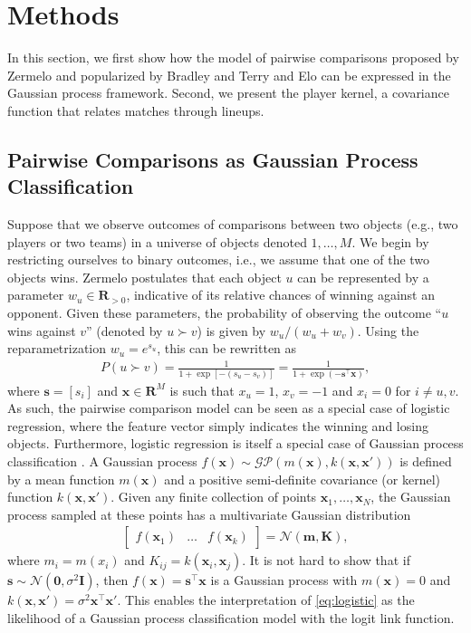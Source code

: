 \section{Methods}
\label{sec:methods}

In this section, we first show how the model of pairwise comparisons proposed by Zermelo \cite{zermelo1928berechnung} and popularized by Bradley and Terry \cite{bradley1952rank} and Elo \cite{elo1978rating} can be expressed in the Gaussian process framework.
Second, we present the player kernel, a covariance function that relates matches through lineups.


\subsection{Pairwise Comparisons as Gaussian Process Classification}

Suppose that we observe outcomes of comparisons between two objects (e.g., two players or two teams) in a universe of objects denoted $1, \ldots, M$.
We begin by restricting ourselves to binary outcomes, i.e., we assume that one of the two objects wins.
Zermelo \cite{zermelo1928berechnung} postulates that each object $u$ can be represented by a parameter $w_u \in \mathbf{R}_{>0}$, indicative of its relative chances of winning against an opponent.
Given these parameters, the probability of observing the outcome ``$u$ wins against $v$'' (denoted by $u \succ v$) is given by $w_u / (w_u + w_v)$.
Using the reparametrization $w_u = e^{s_u}$, this can be rewritten as
\begin{align}
\label{eq:logistic}
P(u \succ v) = \frac{1}{1 + \exp[-(s_u - s_v)]} = \frac{1}{1 + \exp(- \bm{s}^\top \bm{x})},
\end{align}
where $\bm{s} = [s_i]$ and $\bm{x} \in \mathbf{R}^M$ is such that $x_u = 1$, $x_v = -1$ and $x_i = 0$ for $i \ne u, v$.
As such, the pairwise comparison model can be seen as a special case of logistic regression, where the feature vector simply indicates the winning and losing objects.
Furthermore, logistic regression is itself a special case of Gaussian process classification \cite[Ch. 3]{rasmussen2006gaussian}.
A Gaussian process $f(\bm{x}) \sim \mathcal{GP}(m(\bm{x}), k(\bm{x}, \bm{x}'))$ is defined by a mean function $m(\bm{x})$ and a positive semi-definite covariance (or kernel) function $k(\bm{x}, \bm{x}')$.
Given any finite collection of points $\bm{x}_1, \ldots, \bm{x}_N$, the Gaussian process sampled at these points has a multivariate Gaussian distribution
\begin{align*}
\begin{bmatrix}
f(\bm{x}_1) & \dots & f(\bm{x}_k)
\end{bmatrix} = \mathcal{N}(\bm{m}, \bm{K}),
\end{align*}
where $m_i = m(x_i)$ and $K_{ij} = k(\bm{x}_i, \bm{x}_j)$.
It is not hard to show that if $\bm{s} \sim \mathcal{N}(\bm{0}, \sigma^2 \bm{I})$, then $f(\bm{x}) = \bm{s}^\top \bm{x}$ is a Gaussian process with $m(\bm{x}) = 0$ and $k(\bm{x}, \bm{x}') = \sigma^2 \bm{x}^\top \bm{x}'$.
This enables the interpretation of \eqref{eq:logistic} as the likelihood of a Gaussian process classification model with the logit link function.

